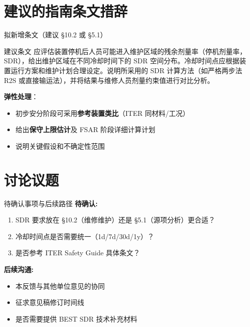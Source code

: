 \documentclass[aspectratio=169]{ctexbeamer}
\begin{document}
\section{建议的指南条文措辞}

\begin{frame}{拟新增条文（建议 §10.2 或 §5.1）}
	\begin{block}{建议条文}
		应评估装置停机后人员可能进入维护区域的残余剂量率（停机剂量率，SDR），给出维护区域在不同冷却时间下的 SDR 空间分布。冷却时间点应根据装置运行方案和维护计划合理设定。说明所采用的 SDR 计算方法（如严格两步法 R2S 或直接输运法），并将结果与维修人员剂量约束值进行对比分析。
	\end{block}

	\vspace{8pt}
	\textbf{弹性处理}：
	\begin{itemize}
		\item 初步安分阶段可采用\textbf{参考装置类比}（ITER 同材料/工况）
		\item 给出\textbf{保守上限估计}及 FSAR 阶段详细计算计划
		\item 说明关键假设和不确定性范围
	\end{itemize}
\end{frame}

\section{讨论议题}

\begin{frame}{待确认事项与后续路径}
	\textbf{待确认:}
	\begin{enumerate}
		\item SDR 要求放在 §10.2（维修维护）还是 §5.1（源项分析）更合适？
		\item 冷却时间点是否需要统一（1d/7d/30d/1y）？
		\item 是否参考 ITER Safety Guide 具体条文？
	\end{enumerate}

	\vspace{12pt}
	\textbf{后续沟通:}
	\begin{itemize}
		\item 本反馈与其他单位意见的协同
		\item 征求意见稿修订时间线
		\item 是否需要提供 BEST SDR 技术补充材料
	\end{itemize}
\end{frame}
\end{document}
